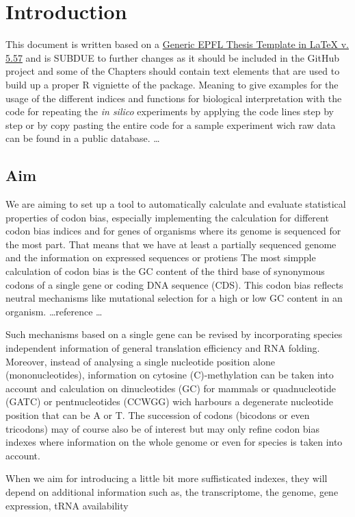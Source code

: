 \chapter*{Introduction}
This document is written based on a \href{http://phd.epfl.ch/thesistemplates}{Generic EPFL Thesis Template in LaTeX v. 5.57} and is SUBDUE to further changes as it should be included in the GitHub project and some of the Chapters should contain text elements that are used to build up a proper R vigniette of the package. Meaning to give examples for the usage of the different indices and functions for biological interpretation with the code for repeating the \textit{in silico} experiments by applying the code lines step by step or by copy pasting the entire code for a sample experiment wich raw data can be found in a public database.     \dots

\section{Aim}
We are aiming to set up a tool to automatically calculate and evaluate statistical properties of codon bias, especially implementing the calculation for different codon bias indices and for genes of organisms where its genome is sequenced for the most part. That means that we have at least a partially sequenced genome and the information on expressed sequences or protiens
The most simpple calculation of codon bias is the GC content of the third base of synonymous codons of a single gene or coding DNA sequence (CDS). This codon bias reflects neutral mechanisms like mutational selection for a high or low GC content in an organism.
\dots reference \cite{atc2013} \dots

Such mechanisms based on a single gene can be revised by incorporating species independent information of general translation efficiency and RNA folding. Moreover, instead of analysing a single nucleotide position alone (mononucleotides), information on cytosine (C)-methylation can be taken into account and calculation on dinucleotides (GC) for mammals or quadnucleotide (GATC) or pentnucleotides (CCWGG) wich harbours a degenerate nucleotide position that can be A or T. The succession of codons (bicodons or even tricodons) may of course also be of interest but may only refine codon bias indexes where information on the whole genome or even for species is taken into account.

When we aim for introducing a little bit more suffisticated indexes, they will depend on additional information such as, the transcriptome, the genome, gene expression, tRNA availability


